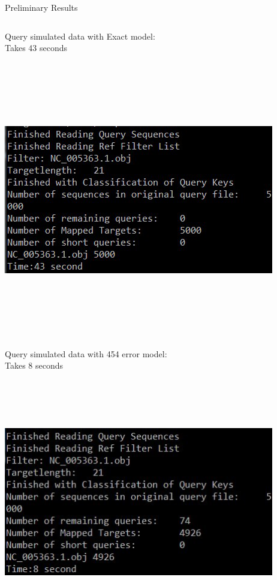 \documentclass[xcolor=x11names,compress]{beamer}
\renewcommand{\(}{\begin{columns}}
\renewcommand{\)}{\end{columns}}
\newcommand{\<}[1]{\begin{column}{#1}}
\renewcommand{\>}{\end{column}}
\begin{document}
\begin{frame}{Preliminary Results}
\begin{columns}[c] %

Query simulated data with Exact model: \\
Takes 43 seconds \\
\vspace{0.5cm}
		\includegraphics[width=1\textwidth, height=0.84\textwidth]{bloomresults1.png}\\
Query simulated data with 454 error model: \\
Takes 8 seconds \\
\vspace{0.5cm}
         \includegraphics[width=1\textwidth, height=0.75\textwidth]{bloomresults2.png}\\
\end{columns}

\end{frame}
\end{document}
